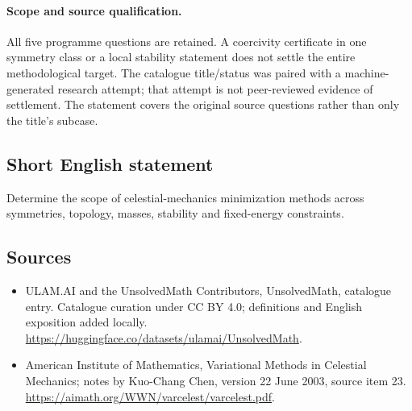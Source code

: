 \documentclass[11pt]{article}
\begin{document}
\paragraph{Scope and source qualification.}All five programme questions are retained. A coercivity certificate in one symmetry class or a local stability statement does not settle the entire methodological target. The catalogue title/status was paired with a machine-generated research attempt; that attempt is not peer-reviewed evidence of settlement. The statement covers the original source questions rather than only the title’s subcase.
\subsection{Short English statement}
Determine the scope of celestial-mechanics minimization methods across symmetries, topology, masses, stability and fixed-energy constraints.
\subsection{Sources}
\begin{itemize}
\item[\hypertarget{source:statement:1}{S1}] ULAM.AI and the UnsolvedMath Contributors, UnsolvedMath, catalogue entry. Catalogue curation under CC BY 4.0; definitions and English exposition added locally.
\url{https://huggingface.co/datasets/ulamai/UnsolvedMath}.
\item[\hypertarget{source:statement:2}{S2}] American Institute of Mathematics, Variational Methods in Celestial Mechanics; notes by Kuo-Chang Chen, version 22 June 2003, source item 23.
\url{https://aimath.org/WWN/varcelest/varcelest.pdf}.
\end{itemize}
\label{end:statement}
\end{document}
